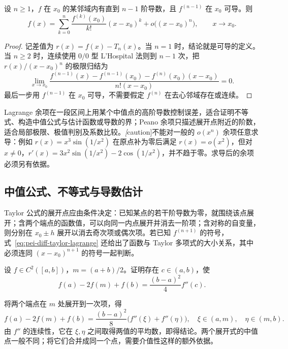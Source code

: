 \begin{theorem}
\label{thm:pei-diff-taylor-peano}
设 $n\ge1$，$f$ 在 $x_0$ 的某邻域内有直到 $n-1$ 阶导数，且 $f^{(n-1)}$ 在 $x_0$ 可导。则
\begin{equation}
 f(x)=\sum_{k=0}^n\frac{f^{(k)}(x_0)}{k!}(x-x_0)^k
       +o\bigl((x-x_0)^n\bigr),\qquad x\to x_0.
 \label{eq:pei-diff-taylor-peano}
\end{equation}
\end{theorem}
\begin{proof}
记差值为 $r(x)=f(x)-T_n(x)$。当 $n=1$ 时，结论就是可导的定义。当 $n\ge2$ 时，连续使用 $0/0$ 型 L'Hospital 法则到 $n-1$ 次，把 $r(x)/(x-x_0)^n$ 的极限归结为
\[
 \lim_{x\to x_0}
 \frac{f^{(n-1)}(x)-f^{(n-1)}(x_0)-f^{(n)}(x_0)(x-x_0)}{n!(x-x_0)}=0.
\]
最后一步用 $f^{(n-1)}$ 在 $x_0$ 可导，不需要假定 $f^{(n)}$ 在去心邻域存在或连续。
\end{proof}

Lagrange 余项在一段区间上用某个中值点的高阶导数控制误差，适合证明不等式、构造中值公式与估计函数或导数的界；Peano 余项只描述展开点附近的阶数，适合局部极限、极值判别及系数比较。\emph[caution]{不能对一般的 $o(x^n)$ 余项任意求导}：例如 $r(x)=x^3\sin(1/x^2)$ 在原点补为零后满足 $r(x)=o(x^2)$，但对 $x\ne0$，$r'(x)=3x^2\sin(1/x^2)-2\cos(1/x^2)$，并不趋于零。求导后的余项必须另有依据。

\subsection{中值公式、不等式与导数估计}

Taylor 公式的展开点应由条件决定：已知某点的若干阶导数为零，就围绕该点展开；含两个端点的函数值，可以向同一内点展开并消去一阶项；含对称的自变量，则分别在 $x_0\pm h$ 展开以消去奇次项或偶次项。若已知 $f^{(n+1)}$ 的符号，式~\eqref{eq:pei-diff-taylor-lagrange} 还给出了函数与 Taylor 多项式的大小关系，其中必须连同 $(x-x_0)^{n+1}$ 的符号一起判断。

\begin{example}
\label{ex:pei-diff-second-difference}
设 $f\in C^2([a,b])$，$m=(a+b)/2$。证明存在 $c\in(a,b)$，使
\[
 f(a)-2f(m)+f(b)=\frac{(b-a)^2}{4}f''(c).
\]
\end{example}
\begin{solve}
将两个端点在 $m$ 处展开到一次项，得
\[
 f(a)-2f(m)+f(b)
 =\frac{(b-a)^2}{8}\bigl(f''(\xi)+f''(\eta)\bigr),
 \quad \xi\in(a,m),\quad\eta\in(m,b).
\]
由 $f''$ 的连续性，它在 $\xi,\eta$ 之间取得两值的平均数，即得结论。两个展开式的中值点一般不同；将它们合并成同一个点，需要介值性这样的额外依据。
\end{solve}

